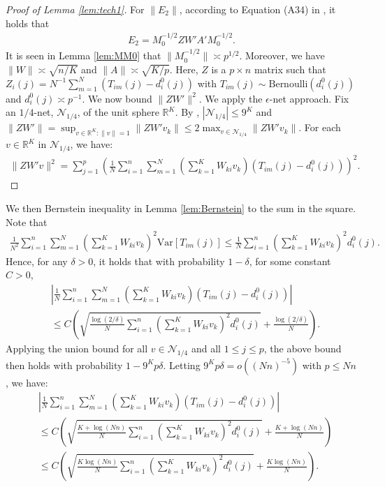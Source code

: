 \documentclass[preprint,11pt]{article}
\newcommand{\mbb}{\mathbb}
\newcommand{\Var}{\text{Var}}
\newcommand{\mcal}{\mathcal}
\numberwithin{equation}{section}
\begin{document}
\begin{proof}[Proof of Lemma \ref{lem:tech1}]
    For $\|E_2\|$, according to Equation (A34) in \cite{ke2024entry}, it holds that
    \begin{align*}
        E_2 = M_0^{-1/2}ZW'A'M_0^{-1/2}.
    \end{align*}
    It is seen in Lemma \ref{lem:MM0} that $\|M_0^{-1/2}\|\asymp p^{1/2}$. Moreover, we have $\|W\|\asymp \sqrt{n/K}$ and $\|A\|\asymp \sqrt{K/p}$. Here, $Z$ is a $p\times n$ matrix such that $Z_i(j)=N^{-1}\sum_{m=1}^N(T_{im}(j)-d_i^0(j))$ with $T_{im}(j)\sim\text{Bernoulli}(d_i^0(j))$ and $d_i^0(j)\asymp p^{-1}$. We now bound $\|ZW'\|^2$. We apply the $\epsilon$-net approach. Fix an $1/4$-net, $\mcal{N}_{1/4}$, of the unit sphere $\mbb{R}^K$. By \cite[Lemma 5.2 and Lemma 5.4]{vershynin2010introduction}, $|\mcal{N}_{1/4}|\le 9^K$ and $\|ZW'\|=\sup_{v\in\mbb{R}^K:\|v\|=1}\|ZW'v_k\|\le 2\max_{v\in\mcal{N}_{1/4}}\|ZW'v_k\|$. For each $v\in\mbb{R}^K$ in $\mcal{N}_{1/4}$, we have:
    \begin{align*}
        \|ZW'v\|^2 = \sum_{j=1}^p\left(\frac{1}{N}\sum_{i=1}^n\sum_{m=1}^N\left(\sum_{k=1}^KW_{ki}v_k\right)(T_{im}(j)-d_i^0(j))\right)^2.
    \end{align*}
\end{proof}
We then Bernstein inequality in Lemma \ref{lem:Bernstein} to the sum in the square. Note that
\begin{align*}
    \frac{1}{N^2}\sum_{i=1}^n\sum_{m=1}^N\left(\sum_{k=1}^KW_{ki}v_k\right)^2\Var[T_{im}(j)]\le \frac{1}{N}\sum_{i=1}^n\left(\sum_{k=1}^KW_{ki}v_k\right)^2d_i^0(j).
\end{align*}
Hence, for any $\delta>0$, it holds that with probability $1-\delta$, for some constant $C>0$,
\begin{align*}
    &\left|\frac{1}{N}\sum_{i=1}^n\sum_{m=1}^N\left(\sum_{k=1}^KW_{ki}v_k\right)(T_{im}(j)-d_i^0(j))\right|\\
    &\le C\left(\sqrt{\frac{\log(2/\delta)}{N}\sum_{i=1}^n\left(\sum_{k=1}^KW_{ki}v_k\right)^2d_i^0(j)}+\frac{\log(2/\delta)}{N}\right).
\end{align*}
Applying the union bound for all $v\in \mcal{N}_{1/4}$ and all $1\le j\le p$, the above bound then holds with probability $1-9^Kp\delta$. Letting $9^Kp\delta=o((Nn)^{-5})$ with $p\le Nn$, we have:
\begin{align*}
    &\left|\frac{1}{N}\sum_{i=1}^n\sum_{m=1}^N\left(\sum_{k=1}^KW_{ki}v_k\right)(T_{im}(j)-d_i^0(j))\right|\\
    &\le C\left(\sqrt{\frac{K+\log(Nn)}{N}\sum_{i=1}^n\left(\sum_{k=1}^KW_{ki}v_k\right)^2d_i^0(j)}+\frac{K+\log(Nn)}{N}\right)\\
    &\le C\left(\sqrt{\frac{K\log(Nn)}{N}\sum_{i=1}^n\left(\sum_{k=1}^KW_{ki}v_k\right)^2d_i^0(j)}+\frac{K\log(Nn)}{N}\right).
\end{align*}
\end{document}
